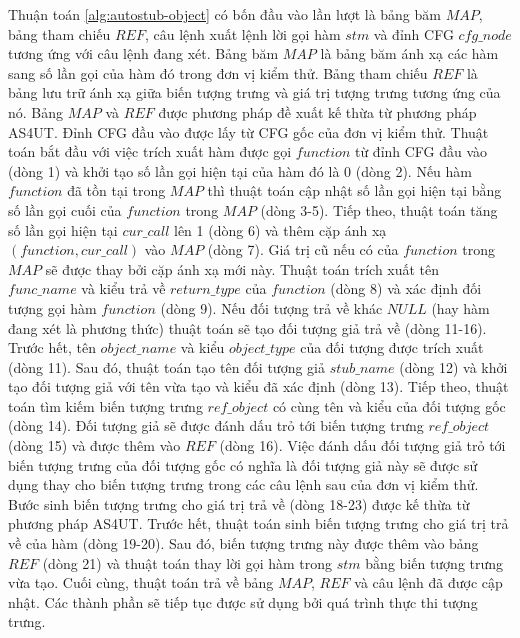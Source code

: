 Thuận toán \ref{alg:autostub-object} có bốn đầu vào lần lượt là bảng băm $MAP$, bảng tham chiếu $REF$, câu lệnh xuất lệnh lời gọi hàm $stm$ và đỉnh CFG $cfg\_node$ tương ứng với câu lệnh đang xét. Bảng băm $MAP$ là bảng băm ánh xạ các hàm sang số lần gọi của hàm đó trong đơn vị kiểm thử. Bảng tham chiếu $REF$ là bảng lưu trữ ánh xạ giữa biến tượng trưng và giá trị tượng trưng tương ứng của nó. Bảng $MAP$ và $REF$ được phương pháp đề xuất kế thừa từ phương pháp AS4UT. Đỉnh CFG đầu vào được lấy từ CFG gốc của đơn vị kiểm thử. Thuật toán bắt đầu với việc trích xuất hàm được gọi $function$ từ đỉnh CFG đầu vào (dòng 1) và khởi tạo số lần gọi hiện tại của hàm đó là 0 (dòng 2). Nếu hàm $function$ đã tồn tại trong $MAP$ thì thuật toán cập nhật số lần gọi hiện tại bằng số lần gọi cuối của $function$ trong $MAP$ (dòng 3-5). Tiếp theo, thuật toán tăng số lần gọi hiện tại $cur\_call$ lên 1 (dòng 6) và thêm cặp ánh xạ $(function, cur\_call)$ vào $MAP$ (dòng 7). Giá trị cũ nếu có của $function$ trong $MAP$ sẽ được thay bởi cặp ánh xạ mới này. Thuật toán trích xuất tên $func\_name$ và kiểu trả về $return\_type$ của $function$ (dòng 8) và xác định đối tượng gọi hàm $function$ (dòng 9). Nếu đối tượng trả về khác $NULL$ (hay hàm đang xét là phương thức) thuật toán sẽ tạo đối tượng giả trả về (dòng 11-16). Trước hết, tên $object\_name$ và kiểu $object\_type$ của đối tượng được trích xuất (dòng 11). Sau đó, thuật toán tạo tên đối tượng giả $stub\_name$ (dòng 12) và khởi tạo đối tượng giả với tên vừa tạo và kiểu đã xác định (dòng 13). Tiếp theo, thuật toán tìm kiếm biến tượng trưng $ref\_object$ có cùng tên và kiểu của đối tượng gốc (dòng 14). Đối tượng giả sẽ được đánh dấu trỏ tới biến tượng trưng $ref\_object$ (dòng 15) và được thêm vào $REF$ (dòng 16). Việc đánh dấu đối tượng giả trỏ tới biến tượng trưng của đối tượng gốc có nghĩa là đối tượng giả này sẽ được sử dụng thay cho biến tượng trưng trong các câu lệnh sau của đơn vị kiểm thử. Bước sinh biến tượng trưng cho giá trị trả về (dòng 18-23) được kế thừa từ phương pháp AS4UT. Trước hết, thuật toán sinh biến tượng trưng cho giá trị trả về của hàm (dòng 19-20). Sau đó, biến tượng trưng này được thêm vào bảng $REF$ (dòng 21) và thuật toán thay lời gọi hàm trong $stm$ bằng biến tượng trưng vừa tạo. Cuối cùng, thuật toán trả về bảng $MAP$, $REF$ và câu lệnh đã được cập nhật. Các thành phần sẽ tiếp tục được sử dụng bởi quá trình thực thi tượng trưng.  

